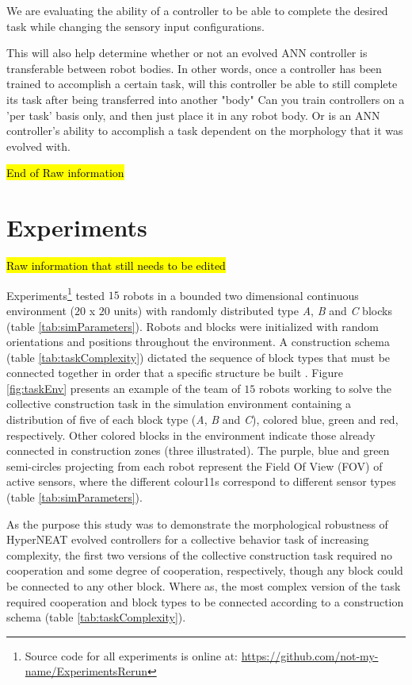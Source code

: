 \documentclass[conference]{IEEEtran}
\begin{document}
We are evaluating the ability of a controller to be able to complete the desired task while changing the sensory input configurations. 

This will also help determine whether or not an evolved ANN controller is transferable between robot bodies. In other words, once a controller has been trained to accomplish a certain task, will this controller be able to still complete its task after being transferred into another "body"
Can you train controllers on a 'per task' basis only, and then just place it in any robot body. Or is an ANN controller's ability to accomplish a task dependent on the morphology that it was evolved with.
	
\hl{End of Raw information}
	
\section{Experiments}\label{sec:experiments}

\hl{Raw information that still needs to be edited}

Experiments\footnote{Source code for all experiments is online at: \url{https://github.com/not-my-name/ExperimentsRerun}}
tested $15$ robots in a bounded two dimensional continuous environment
($20$ x $20$ units) with randomly distributed type \textit{A}, \textit{B} and
\textit{C} blocks (table \ref{tab:simParameters}).
Robots and blocks were initialized with random orientations and positions throughout the environment.
A construction schema (table \ref{tab:taskComplexity}) dictated the sequence of block
types that must be connected together in order that a specific structure be built \cite{NitschkeSaEC2012}.
Figure \ref{fig:taskEnv} presents an example of the team of $15$ robots working to solve the
collective construction task in the simulation environment containing a distribution of five of each
block type (\textit{A}, \textit{B} and \textit{C}), colored blue, green and red, respectively.
Other colored blocks in the environment indicate those already connected in construction zones
(three illustrated).  The purple, blue and green semi-circles projecting from each robot
represent the Field Of View (FOV) of active sensors, where the different colour11s correspond to different
sensor types (table \ref{tab:simParameters}).

As the purpose this study was to demonstrate the morphological robustness of
HyperNEAT evolved controllers for a collective behavior task of increasing complexity,
the first two versions of the collective construction task required no cooperation and some degree of
cooperation, respectively, though any block could be connected to any other block.
Where as, the most complex version of the task required cooperation and block types
to be connected according to a construction schema (table \ref{tab:taskComplexity}).
\end{document}
